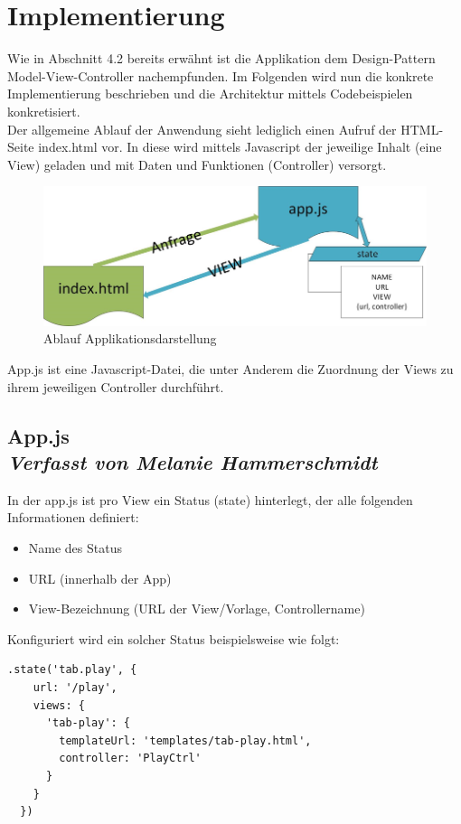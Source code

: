 \newpage
\section{Implementierung}

Wie in Abschnitt 4.2 bereits erwähnt ist die Applikation dem Design-Pattern Model-View-Controller nachempfunden. Im Folgenden wird nun die konkrete Implementierung beschrieben und die Architektur mittels Codebeispielen konkretisiert.
\\
Der allgemeine Ablauf der Anwendung sieht lediglich einen Aufruf der HTML-Seite index.html vor. In diese wird mittels Javascript der jeweilige Inhalt (eine View) geladen und mit Daten und Funktionen (Controller) versorgt.
\begin{figure}[h]
\centering
\includegraphics[width=1\textwidth]{ref/images/index.png}
\caption[Ablauf Applikationsdarstellung]{Ablauf Applikationsdarstellung}
\label{fig:HTML-Darstellung}
\end{figure}

App.js ist eine Javascript-Datei, die unter Anderem die Zuordnung der Views zu ihrem jeweiligen Controller durchführt. 
\subsection[App.js]{App.js
 \\ \textnormal{\small{\textit {Verfasst von Melanie Hammerschmidt}}}}
 
In der app.js ist pro View ein Status (state) hinterlegt, der alle folgenden Informationen definiert:
\begin{itemize}
\item Name des Status
\item URL (innerhalb der App)
\item View-Bezeichnung (URL der View/Vorlage, Controllername)
\end{itemize}
Konfiguriert wird ein solcher Status beispielsweise wie folgt:
\begin{lstlisting}
.state('tab.play', {
    url: '/play',
    views: {
      'tab-play': {
        templateUrl: 'templates/tab-play.html',
        controller: 'PlayCtrl'
      }
    }
  })
\end{lstlisting}

